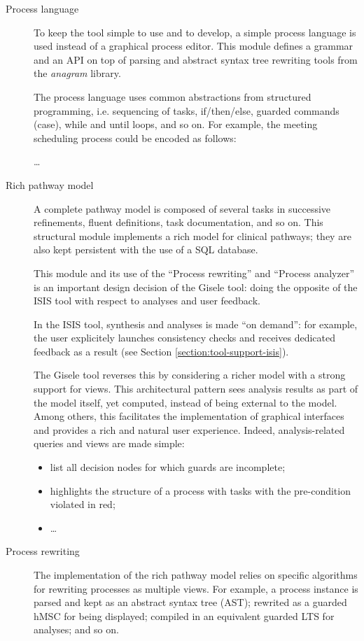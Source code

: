 \begin{description}
\item[Process language] To keep the tool simple to use and to develop, a simple process language is used instead of a graphical process editor. This module defines a grammar and an API on top of parsing and abstract syntax tree rewriting tools from the \emph{anagram} library.

The process language uses common abstractions from structured programming, i.e. sequencing of tasks, if/then/else, guarded commands (case), while and until loops, and so on. For example, the meeting scheduling process could be encoded as follows:

\ldots

\item[Rich pathway model] A complete pathway model is composed of several tasks in successive refinements, fluent definitions, task documentation, and so on. This structural module implements a rich model for clinical pathways; they are also kept persistent with the use of a SQL database.

This module and its use of the ``Process rewriting'' and ``Process analyzer'' is an important design decision of the Gisele tool: doing the opposite of the ISIS tool with respect to analyses and user feedback. 

In the ISIS tool, synthesis and analyses is made ``on demand'': for example, the user explicitely launches consistency checks and receives dedicated feedback as a result (see Section \ref{section:tool-support-isis}).

The Gisele tool reverses this by considering a richer model with a strong support for views. This architectural pattern sees analysis results as part of the model itself, yet computed, instead of being external to the model. Among others, this facilitates the implementation of graphical interfaces and provides a rich and natural user experience. Indeed, analysis-related queries and views are made simple:

\begin{itemize}
\item list all decision nodes for which guards are incomplete;
\item highlights the structure of a process with tasks with the pre-condition violated in red;
\item \ldots
\end{itemize}

\item[Process rewriting] The implementation of the rich pathway model relies on specific algorithms for rewriting processes as multiple views. For example, a process instance is parsed and kept as an abstract syntax tree (AST); rewrited as a guarded hMSC for being displayed; compiled in an equivalent guarded LTS for analyses; and so on. 


\end{description}
